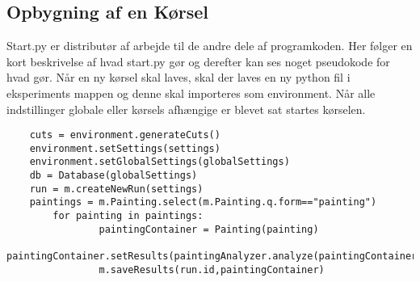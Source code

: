 {
\subsection{Opbygning af en Kørsel}
Start.py er distributør af arbejde til de andre dele af programkoden.
Her følger en kort beskrivelse af hvad start.py gør og derefter kan ses
noget pseudokode for hvad gør.
Når en ny kørsel skal laves, skal der laves en ny python fil i
eksperiments mappen og denne skal importeres som environment.
Når alle indstillinger globale eller kørsels afhængige er blevet sat
startes kørselen.
\begin{lstlisting}
	cuts = environment.generateCuts()
	environment.setSettings(settings)
	environment.setGlobalSettings(globalSettings)
	db = Database(globalSettings)
	run = m.createNewRun(settings)
	paintings = m.Painting.select(m.Painting.q.form=="painting")
		for painting in paintings:
				paintingContainer = Painting(painting)
				paintingContainer.setResults(paintingAnalyzer.analyze(paintingContainer,settings))
				m.saveResults(run.id,paintingContainer)
\end{lstlisting}
}
